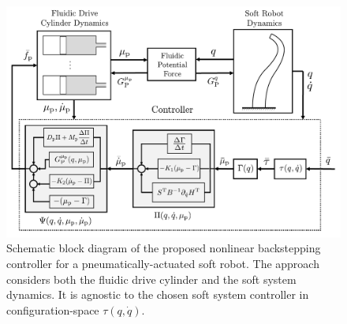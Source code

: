 %
%
% 


\begin{figure}[t]
  \centering
  \includegraphics[width=0.9\columnwidth]{backstepping/figures/backstepping_graphics_control_scheme_v3_cropped.pdf}
  \caption{Schematic block diagram of the proposed nonlinear backstepping controller for a pneumatically-actuated soft robot. The approach considers both the fluidic drive cylinder and the soft system dynamics. It is agnostic to the chosen soft system controller in configuration-space $\tau(q,\dot{q})$.}\label{fig:backstepping:control_scheme}
\end{figure}

